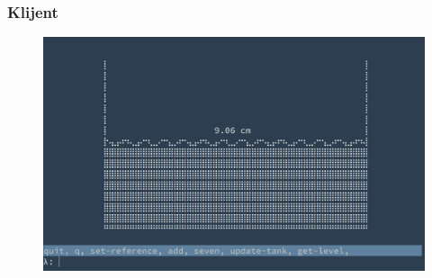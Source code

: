 \documentclass[dvipsnames]{beamer}
\begin{document}
\begin{frame}[fragile]
    \frametitle{Klijent}
    \begin{figure}[H]
    \centering
    \includegraphics[scale=0.15]{../figures/arclient-2.png}
    \label{fig:arduino}
    \end{figure}
\end{frame}


\end{document}
